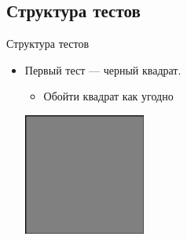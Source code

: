 \subsection{Структура тестов}

\begin{frame}[t]{Структура тестов}
    \begin{itemize}
        \item Первый тест --- черный квадрат.
        \begin{itemize}
            \item Обойти квадрат как угодно
        \end{itemize}

        \includegraphics[height=4cm]{cham01.png}
    \end{itemize}
\end{frame}
